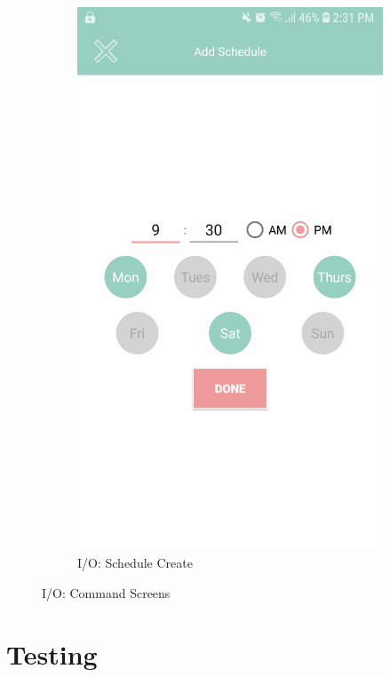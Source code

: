 \documentclass[12pt, oneside, a4paper]{book}
\begin{document}
\begin{figure}[H]
\begin{subfigure}[b]{.35\linewidth}
				\includegraphics[width=\linewidth]{img/output_schedule.jpg}
				\caption{I/O: Schedule Create}
			\end{subfigure}
			\caption{I/O: Command Screens}
			\label{output:command}
		\end{figure}

		\newpage	
	\chapter{Testing}
\end{document}
